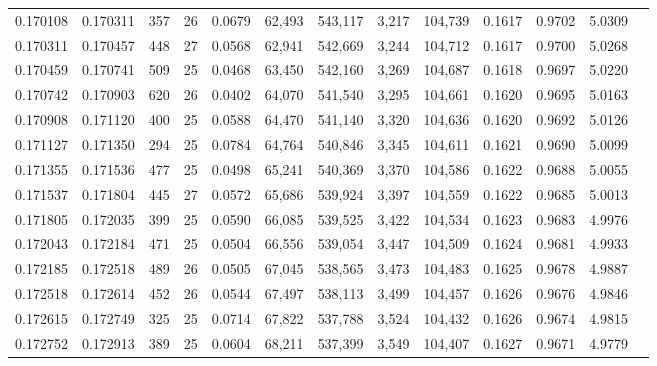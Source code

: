 \begin{tabular}{rrrrrrrrrrrrr}
0.170108 & 0.170311 &   357 &  26 &                                     0.0679 &  62,493 & 543,117 &   3,217 & 104,739 & 0.1617 & 0.9702 & 5.0309 \\
0.170311 & 0.170457 &   448 &  27 &                                     0.0568 &  62,941 & 542,669 &   3,244 & 104,712 & 0.1617 & 0.9700 & 5.0268 \\
0.170459 & 0.170741 &   509 &  25 &                                     0.0468 &  63,450 & 542,160 &   3,269 & 104,687 & 0.1618 & 0.9697 & 5.0220 \\
0.170742 & 0.170903 &   620 &  26 &                                     0.0402 &  64,070 & 541,540 &   3,295 & 104,661 & 0.1620 & 0.9695 & 5.0163 \\
0.170908 & 0.171120 &   400 &  25 &                                     0.0588 &  64,470 & 541,140 &   3,320 & 104,636 & 0.1620 & 0.9692 & 5.0126 \\
0.171127 & 0.171350 &   294 &  25 &                                     0.0784 &  64,764 & 540,846 &   3,345 & 104,611 & 0.1621 & 0.9690 & 5.0099 \\
0.171355 & 0.171536 &   477 &  25 &                                     0.0498 &  65,241 & 540,369 &   3,370 & 104,586 & 0.1622 & 0.9688 & 5.0055 \\
0.171537 & 0.171804 &   445 &  27 &                                     0.0572 &  65,686 & 539,924 &   3,397 & 104,559 & 0.1622 & 0.9685 & 5.0013 \\
0.171805 & 0.172035 &   399 &  25 &                                     0.0590 &  66,085 & 539,525 &   3,422 & 104,534 & 0.1623 & 0.9683 & 4.9976 \\
0.172043 & 0.172184 &   471 &  25 &                                     0.0504 &  66,556 & 539,054 &   3,447 & 104,509 & 0.1624 & 0.9681 & 4.9933 \\
0.172185 & 0.172518 &   489 &  26 &                                     0.0505 &  67,045 & 538,565 &   3,473 & 104,483 & 0.1625 & 0.9678 & 4.9887 \\
0.172518 & 0.172614 &   452 &  26 &                                     0.0544 &  67,497 & 538,113 &   3,499 & 104,457 & 0.1626 & 0.9676 & 4.9846 \\
0.172615 & 0.172749 &   325 &  25 &                                     0.0714 &  67,822 & 537,788 &   3,524 & 104,432 & 0.1626 & 0.9674 & 4.9815 \\
0.172752 & 0.172913 &   389 &  25 &                                     0.0604 &  68,211 & 537,399 &   3,549 & 104,407 & 0.1627 & 0.9671 & 4.9779 \\

\end{tabular}
